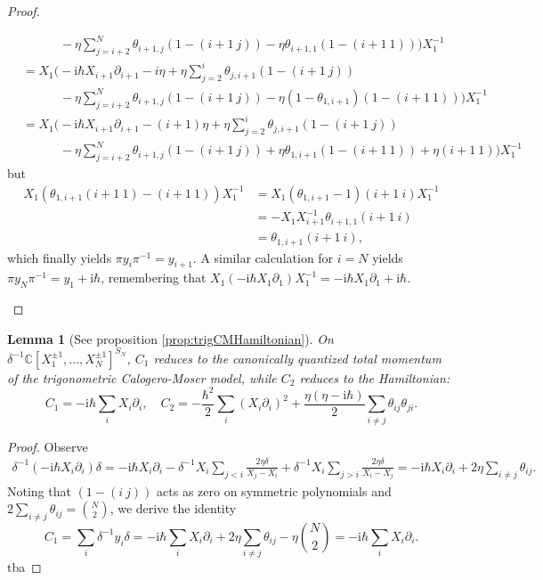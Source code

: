 \documentclass[11pt]{report}
\newtheorem{lemma}[theorem]{Lemma}
\theoremstyle{definition}
\theoremstyle{remark}
\theoremstyle{remark}
\newcommand{\C}{\mathbb{C}}
\newcommand{\I}{\mathrm{i}}
\begin{document}
\begin{proof}
\begin{enumerate}[label=(\roman*)]
\begin{align*}
&\quad \quad \quad - \eta \sum_{j=i+2}^N \theta_{i+1,j} (1-(i+1 \ j)) - \eta \theta_{i+1,1} (1-(i+1 \ 1)) \bigg) X_1^{-1} \\
&= X_1 \bigg( -\I \hbar X_{i+1} \partial_{i+1} - i \eta + \eta \sum_{j=2}^{i} \theta_{j,i+1} (1-(i+1 \ j)) \\
&\quad \quad \quad - \eta \sum_{j=i+2}^N \theta_{i+1,j} (1-(i+1 \ j)) - \eta (1-\theta_{1,i+1})(1-(i+1 \ 1)) \bigg) X_1^{-1} \\
&= X_1 \bigg( -\I \hbar X_{i+1} \partial_{i+1} - (i+1) \eta + \eta \sum_{j=2}^{i} \theta_{j,i+1} (1-(i+1 \ j)) \\
&\quad \quad \quad - \eta \sum_{j=i+2}^N \theta_{i+1,j} (1-(i+1 \ j)) + \eta \theta_{1,i+1}(1-(i+1 \ 1)) + \eta(i+1 \ 1) \bigg) X_1^{-1}
\end{align*}
but
\begin{align*}
X_1 (\theta_{1,i+1}(i+1 \ 1) - (i+1 \ 1)) X_1^{-1}
&= X_1 (\theta_{1,i+1}-1) (i+1 \ i) X_1^{-1} \\
&= - X_1 X_{i+1}^{-1} \theta_{i+1,1} (i+1 \ i) \\
&= \theta_{1,i+1} (i+1 \ i),
\end{align*}
which finally yields $\pi y_i \pi^{-1} = y_{i+1}$. A similar calculation for $i=N$ yields $\pi y_N \pi^{-1} = y_1 + \I \hbar$, remembering that $X_1 (-\I \hbar X_1 \partial_1) X_1^{-1} = -\I \hbar X_1 \partial_1 + \I \hbar$.
\vspace{-1.5\baselineskip}
\end{enumerate}
\end{proof}

\begin{lemma}[See proposition \ref{prop:trigCMHamiltonian}]\label{lemma:trigCMHamiltonianAppendix}
On $\delta^{-1} \C[X_1^{\pm 1},...,X_N^{\pm 1}]^{S_N}$, $C_1$ reduces to the canonically quantized total momentum of the trigonometric Calogero-Moser model, while $C_2$ reduces to the Hamiltonian:
\begin{equation*}
C_1 = -\I \hbar \sum_i X_i \partial_i, \quad C_2 = -\frac{\hbar^2}{2} \sum_i (X_i \partial_i)^2 + \frac{\eta(\eta-\I \hbar)}{2} \sum_{i \neq j} \theta_{ij} \theta_{ji}.
\end{equation*}
\end{lemma}

\begin{proof}
Observe
\begin{align*}
\delta^{-1} (-\I \hbar X_i \partial_i) \delta = -\I \hbar X_i \partial_i - \delta^{-1} X_i \sum_{j<i} \frac{2\eta \delta}{X_j-X_i} + \delta^{-1} X_i \sum_{j>i} \frac{2\eta \delta}{X_i-X_j} = -\I \hbar X_i \partial_i + 2\eta \sum_{i \neq j} \theta_{ij}.
\end{align*}
Noting that $(1-(i \ j))$ acts as zero on symmetric polynomials and $2\sum_{i \neq j} \theta_{ij} = {N \choose 2}$, we derive the identity
\begin{equation*}
C_1 = \sum_i \delta^{-1} y_i \delta = -\I \hbar \sum_i X_i \partial_i + 2\eta \sum_{i \neq j} \theta_{ij} - \eta {N \choose 2} = -\I \hbar \sum_i X_i \partial_i.
\end{equation*}
tba
\end{proof}
\end{document}
